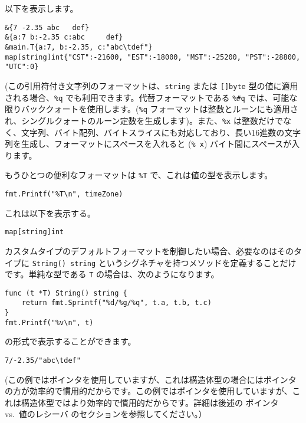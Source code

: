 \documentclass{jsarticle}
\begin{document}
以下を表示します。

\begin{lstlisting}[numbers=none]
&{7 -2.35 abc   def}
&{a:7 b:-2.35 c:abc     def}
&main.T{a:7, b:-2.35, c:"abc\tdef"}
map[string]int{"CST":-21600, "EST":-18000, "MST":-25200, "PST":-28800, "UTC":0}
\end{lstlisting}

(この引用符付き文字列のフォーマットは、\texttt{string} または
\texttt{{[}{]}byte} 型の値に適用される場合、\texttt{\%q}
でも利用できます。代替フォーマットである \texttt{\%\#q}
では、可能な限りバッククォートを使用します。(\texttt{\%q}
フォーマットは整数とルーンにも適用され、シングルクォートのルーン定数を生成します)。また、\texttt{\%x}
は整数だけでなく、文字列、バイト配列、バイトスライスにも対応しており、長い16進数の文字列を生成し、フォーマットにスペースを入れると
(\texttt{\%\ x}) バイト間にスペースが入ります。

もうひとつの便利なフォーマットは \texttt{\%T}
で、これは値の型を表示します。

\begin{lstlisting}[numbers=none]
fmt.Printf("%T\n", timeZone)
\end{lstlisting}

これは以下を表示する。

\begin{lstlisting}[numbers=none]
map[string]int
\end{lstlisting}

カスタムタイプのデフォルトフォーマットを制御したい場合、必要なのはそのタイプに
\texttt{String()\ string}
というシグネチャを持つメソッドを定義することだけです。単純な型である
\texttt{T} の場合は、次のようになります。

\begin{lstlisting}[numbers=none]
func (t *T) String() string {
    return fmt.Sprintf("%d/%g/%q", t.a, t.b, t.c)
}
fmt.Printf("%v\n", t)
\end{lstlisting}

の形式で表示することができます。

\begin{lstlisting}[numbers=none]
7/-2.35/"abc\tdef"
\end{lstlisting}

(この例ではポインタを使用していますが、これは構造体型の場合にはポインタの方が効率的で慣用的だからです。この例ではポインタを使用していますが、これは構造体型ではより効率的で慣用的だからです。詳細は後述の
{ポインタ vs.~値のレシーバ} のセクションを参照してください。）
\end{document}
